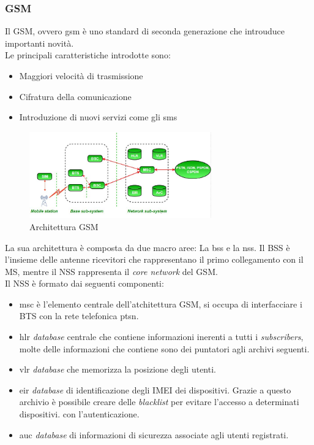 \subsubsection{GSM}
Il GSM, ovvero \gls{gsm}\cite{gsm} è uno standard di seconda generazione che introuduce importanti novità.\\
Le principali caratteristiche introdotte sono:
\begin{itemize}
    \item Maggiori velocità di trasmissione
    \item Cifratura della comunicazione
    \item Introduzione di nuovi servizi come gli \gls{sms}
\end{itemize}
\begin{figure}[ht]
    \centering
    \includegraphics[width=0.7\textwidth]{images/2g-gsm.jpg}
    \caption{Architettura GSM}
\end{figure}
La sua architettura è composta da due macro aree: La \gls{bss} e la \gls{nss}.
Il BSS è l'insieme delle antenne ricevitori che rappresentano il primo collegamento con il MS, mentre il NSS rappresenta il \textit{core network} del GSM.\\
Il NSS è formato dai seguenti componenti:
\begin{itemize}
    \item \gls{msc} è l'elemento centrale dell'atchitettura GSM, si occupa di interfacciare i BTS con la rete telefonica \gls{ptsn}.
    \item \gls{hlr} \textit{database} centrale che contiene informazioni inerenti a tutti i \textit{subscribers}, molte delle informazioni
    che contiene sono dei puntatori agli archivi seguenti.
    \item \gls{vlr} \textit{database} che memorizza la posizione degli utenti.
    \item \gls{eir} \textit{database} di identificazione degli IMEI dei dispositivi. Grazie a questo archivio è possibile creare delle \textit{blacklist}
    per evitare l'accesso a determinati dispositivi.
    con l'autenticazione.
    \item \gls{auc} \textit{database} di informazioni di sicurezza associate agli utenti registrati.
\end{itemize}


